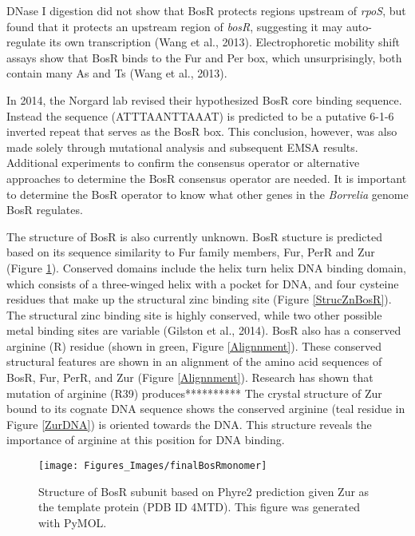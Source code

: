 \documentclass[12pt,twoside]{reedthesis}
\begin{document}
		
		
		 DNase I digestion did not show that BosR protects regions upstream of \textit{rpoS}, but found that it protects an upstream region of \textit{bosR}, suggesting it may auto-regulate its own transcription (Wang et al., 2013). Electrophoretic mobility shift assays show that BosR binds to the Fur and Per box, which unsurprisingly, both contain many As and Ts (Wang et al., 2013). 
	
		In 2014, the Norgard lab revised their hypothesized BosR core binding sequence. Instead the sequence \-(ATTTAANTTAAAT) is predicted to be a putative 6-1-6 inverted repeat that serves as the BosR box. This conclusion, however, was also made solely through mutational analysis and subsequent EMSA results. Additional experiments to confirm the consensus operator or alternative approaches to determine the BosR consensus operator are needed. It is important to determine the BosR operator to know what other genes in the \textit{Borrelia} genome BosR regulates. 
		
	
	 
	 
	 The structure of BosR is also currently unknown. BosR stucture is predicted based on its sequence similarity to Fur family members, Fur, PerR and Zur (Figure \ref{BosRMonomer}). Conserved domains include the helix turn helix DNA binding domain, which consists of a three-winged helix with a pocket for DNA, and four cysteine residues that make up the structural zinc binding site (Figure \ref{StrucZnBosR}). The structural zinc binding site is highly conserved, while two other possible metal binding sites are variable (Gilston et al., 2014). BosR also has a conserved arginine (R) residue (shown in green, Figure \ref{Alignnment}). These conserved structural features are shown in an alignment of the amino acid sequences of BosR, Fur, PerR, and Zur (Figure \ref{Alignnment}). Research has shown that mutation of arginine (R39) produces**********  The crystal structure of Zur bound to its cognate DNA sequence shows the conserved arginine (teal residue in Figure \ref{ZurDNA}) is oriented towards the DNA. This structure reveals the importance of arginine at this position for DNA binding. 
	 
		
	
		 	\begin{figure}[t]
		 		
		 		\centering
		 		\texttt{[image: Figures\_Images/finalBosRmonomer]}
		 		\caption[Predicted structure BosR Monomer]{Structure of BosR subunit based on Phyre2 prediction given Zur as the template protein (PDB ID 4MTD). This figure was generated with PyMOL.}
		 		\label{BosRMonomer}
		 		\end{figure}
		 		
\end{document}
